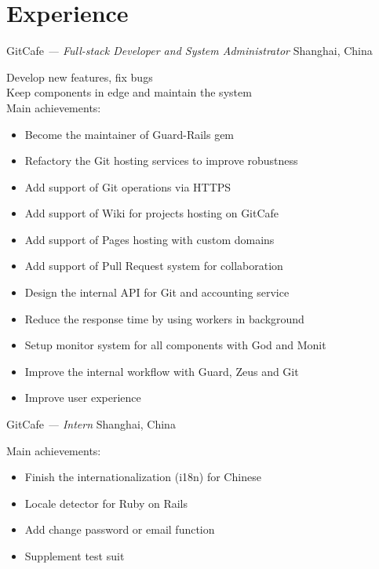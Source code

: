 \documentclass[]{friggeri-cv} %
\begin{document}

\section{Experience}

\begin{entrylist}
  {GitCafe \emph{--- Full-stack Developer and System Administrator}}
  {Shanghai, China}
  {
    Develop new features, fix bugs\\
    Keep components in edge and maintain the system\\
    Main achievements:
    \begin{itemize}
    \item Become the maintainer of Guard-Rails gem
    \item Refactory the Git hosting services to improve robustness
    \item Add support of Git operations via HTTPS
    \item Add support of Wiki for projects hosting on GitCafe
    \item Add support of Pages hosting with custom domains
    \item Add support of Pull Request system for collaboration
    \item Design the internal API for Git and accounting service
    \item Reduce the response time by using workers in background
    \item Setup monitor system for all components with God and Monit
    \item Improve the internal workflow with Guard, Zeus and Git
    \item Improve user experience
    \end{itemize}
  }
  {GitCafe \emph{--- Intern}}
  {Shanghai, China}
  {
    Main achievements:
    \begin{itemize}
    \item Finish the internationalization (i18n) for Chinese
    \item Locale detector for Ruby on Rails
    \item Add change password or email function
    \item Supplement test suit
    \end{itemize}
  }
\end{entrylist}
\end{document}
